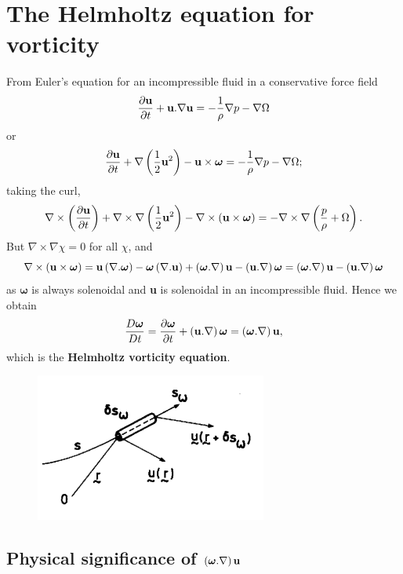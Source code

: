 \documentclass[twoside,a4paper,11pt]{report}
\begin{document}
\section{The Helmholtz equation for vorticity}
\label{subsec:mylabel1}
From Euler's equation for an incompressible fluid in a conservative force 
field
\[
\frac{\partial {{\bf u}}}{\partial t}+{{\bf u}}. \nabla {\rm 
{\bf u}}=-\frac{1}{\rho }\nabla p-\nabla \Omega 
\]
or 
\[ \frac{\partial {{\bf u}}}{\partial t}+\nabla \left( {{1 
\over 2}{{\bf u}}^2} \right)-{{\bf u}}\times 
{\bm\omega} =-\frac{1}{\rho }\nabla p-\nabla \Omega ; \]
taking the curl, 
\[ \nabla \times \left( {\frac{\partial {{\bf 
u}}}{\partial t}} \right)+\nabla \times \nabla \left( {{1 \over 
2}{{\bf u}}^2} \right)-\nabla \times \left( {{{\bf u}}\times {\bm\omega}} 
\right)=-\nabla \times \nabla \left( {\frac{p}{\rho }+\Omega } 
\right). \]
But $\nabla \times \nabla \chi =0$ for all $\chi $, 
and 
\[\nabla \times \left( {{{\bf u}}\times {\bm \omega}} \right)={{\bf 
u}}\left( {\nabla . {\bm \omega}} \right)-{\bm \omega}\left( {\nabla . {{\bf u}}} 
\right)+\left( {{\bm \omega}. \nabla } \right){{\bf u}}-\left( {{{\bf 
u}}. \nabla } \right){\bm \omega}=\left( {{\bm \omega}. \nabla } \right){{\bf 
u}}-\left( {{{\bf u}}. \nabla } \right){\bm \omega} \]
as ${\bm \omega}$ is always solenoidal and \textbf{u} is solenoidal in 
an incompressible fluid. Hence we obtain
\[
\frac{D{\bm \omega}}{Dt}=\frac{\partial {\bm \omega}}{\partial t}+\left( {{{\bf u}}. 
\nabla } \right){\bm \omega}=\left( {{\bm \omega}. \nabla } \right){{\bf u}},
\]
which is the \textbf{Helmholtz vorticity equation}.

\begin{figure}
\centerline{\includegraphics[width=3in]{Section43.pdf}}
\label{fig3}
\end{figure}

\subsection{Physical significance of $\left( {{\bm\omega}. \nabla } \right){\rm 
{\bf u}}$}
\end{document}
